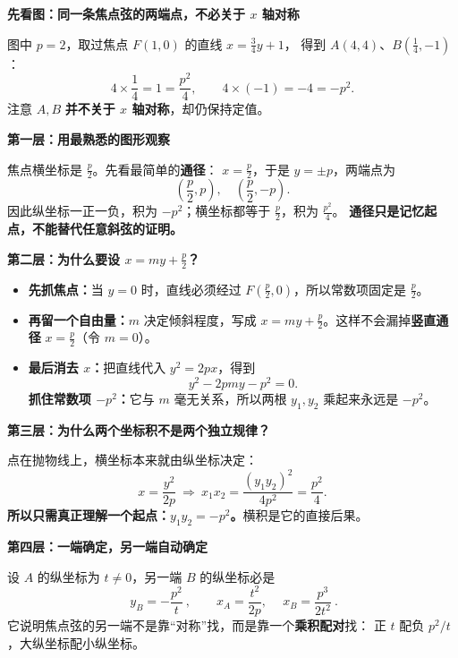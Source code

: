 \begin{explanationbox}
\textbf{\textcolor{CExplanation}{先看图：同一条焦点弦的两端点，不必关于 $x$ 轴对称}}\par\smallskip
\begin{minipage}{\linewidth}
\begin{center}\end{center}
\end{minipage}
\par\smallskip
图中 $p=2$，取过焦点 $F(1,0)$ 的直线 $x=\frac34y+1$，
得到 $A(4,4)$、$B(\frac14,-1)$：
\[
 4\times\frac14=1=\frac{p^2}{4},\qquad
 4\times(-1)=-4=-p^2.
\]
注意 $A,B$ \textbf{并不关于 $x$ 轴对称}，却仍保持定值。

\medskip
\textbf{\textcolor{CExplanation}{第一层：用最熟悉的图形观察}}\par\smallskip
焦点横坐标是 $\frac p2$。先看最简单的\textbf{通径}：
$x=\frac p2$，于是 $y=\pm p$，两端点为
\[
 \left(\frac p2,p\right),\quad \left(\frac p2,-p\right).
\]
因此纵坐标一正一负，积为 $-p^2$；横坐标都等于 $\frac p2$，积为 $\frac{p^2}{4}$。
\textbf{通径只是记忆起点，不能替代任意斜弦的证明。}

\medskip
\textbf{\textcolor{CExplanation}{第二层：为什么要设 $x=my+\frac p2$？}}\par\smallskip
\begin{itemize}[leftmargin=*,itemsep=0.3em]
 \item \textbf{先抓焦点：}当 $y=0$ 时，直线必须经过 $F(\frac p2,0)$，所以常数项固定是 $\frac p2$。
 \item \textbf{再留一个自由量：}$m$ 决定倾斜程度，写成 $x=my+\frac p2$。这样不会漏掉\textbf{竖直通径} $x=\frac p2$（令 $m=0$）。
 \item \textbf{最后消去 $x$：}把直线代入 $y^2=2px$，得到
 \[
 y^2-2pmy-p^2=0.
 \]
 \textbf{抓住常数项 $-p^2$：}它与 $m$ 毫无关系，所以两根 $y_1,y_2$ 乘起来永远是 $-p^2$。
\end{itemize}

\medskip
\textbf{\textcolor{CExplanation}{第三层：为什么两个坐标积不是两个独立规律？}}\par\smallskip
点在抛物线上，横坐标本来就由纵坐标决定：
\[
 x=\frac{y^2}{2p}
 \ \Longrightarrow\ 
 x_1x_2=\frac{(y_1y_2)^2}{4p^2}=\frac{p^2}{4}.
\]
\textbf{所以只需真正理解一个起点：$y_1y_2=-p^2$。}横积是它的直接后果。

\medskip
\textbf{\textcolor{CExplanation}{第四层：一端确定，另一端自动确定}}\par\smallskip
设 $A$ 的纵坐标为 $t\ne0$，另一端 $B$ 的纵坐标必是
\[
 \boxed{\ y_B=-\frac{p^2}{t}\ },\qquad
 x_A=\frac{t^2}{2p},\quad
 \boxed{\ x_B=\frac{p^3}{2t^2}\ }.
\]
它说明焦点弦的另一端不是靠“对称”找，而是靠一个\textbf{乘积配对}找：
正 $t$ 配负 $p^2/t$，大纵坐标配小纵坐标。


\end{explanationbox}
